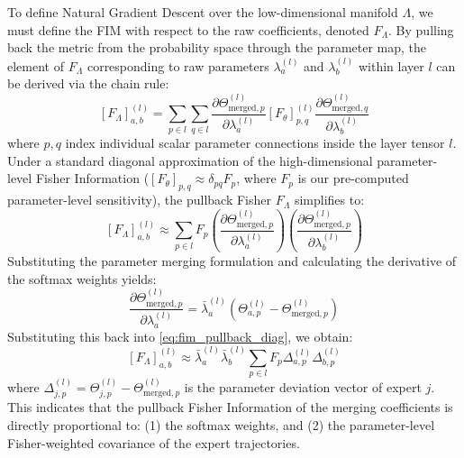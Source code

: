 \documentclass{article}
\theoremstyle{plain}
\theoremstyle{definition}
\theoremstyle{remark}
\begin{document}
To define Natural Gradient Descent over the low-dimensional manifold $\Lambda$, we must define the FIM with respect to the raw coefficients, denoted $F_{\Lambda}$. By pulling back the metric from the probability space through the parameter map, the element of $F_{\Lambda}$ corresponding to raw parameters $\lambda_a^{(l)}$ and $\lambda_b^{(l)}$ within layer $l$ can be derived via the chain rule:
\begin{equation}
    \label{eq:fim_pullback}
    [F_{\Lambda}]_{a, b}^{(l)} = \sum_{p \in l} \sum_{q \in l} \frac{\partial \Theta_{\text{merged}, p}^{(l)}}{\partial \lambda_a^{(l)}} [F_{\theta}]_{p, q}^{(l)} \frac{\partial \Theta_{\text{merged}, q}^{(l)}}{\partial \lambda_b^{(l)}}
\end{equation}
where $p, q$ index individual scalar parameter connections inside the layer tensor $l$. Under a standard diagonal approximation of the high-dimensional parameter-level Fisher Information ($[F_{\theta}]_{p, q} \approx \delta_{pq} F_p$, where $F_p$ is our pre-computed parameter-level sensitivity), the pullback Fisher $F_{\Lambda}$ simplifies to:
\begin{equation}
    \label{eq:fim_pullback_diag}
    [F_{\Lambda}]_{a, b}^{(l)} \approx \sum_{p \in l} F_p \left( \frac{\partial \Theta_{\text{merged}, p}^{(l)}}{\partial \lambda_a^{(l)}} \right) \left( \frac{\partial \Theta_{\text{merged}, p}^{(l)}}{\partial \lambda_b^{(l)}} \right)
\end{equation}
Substituting the parameter merging formulation and calculating the derivative of the softmax weights yields:
\begin{equation}
    \label{eq:param_derivatives}
    \frac{\partial \Theta_{\text{merged}, p}^{(l)}}{\partial \lambda_a^{(l)}} = \bar{\lambda}_a^{(l)} \left( \Theta_{a, p}^{(l)} - \Theta_{\text{merged}, p}^{(l)} \right)
\end{equation}
Substituting this back into \cref{eq:fim_pullback_diag}, we obtain:
\begin{equation}
    \label{eq:fim_pullback_final}
    [F_{\Lambda}]_{a, b}^{(l)} \approx \bar{\lambda}_a^{(l)} \bar{\lambda}_b^{(l)} \sum_{p \in l} F_p \Delta_{a, p}^{(l)} \Delta_{b, p}^{(l)}
\end{equation}
where $\Delta_{j, p}^{(l)} = \Theta_{j, p}^{(l)} - \Theta_{\text{merged}, p}^{(l)}$ is the parameter deviation vector of expert $j$. This indicates that the pullback Fisher Information of the merging coefficients is directly proportional to: (1) the softmax weights, and (2) the parameter-level Fisher-weighted covariance of the expert trajectories. 
\end{document}
